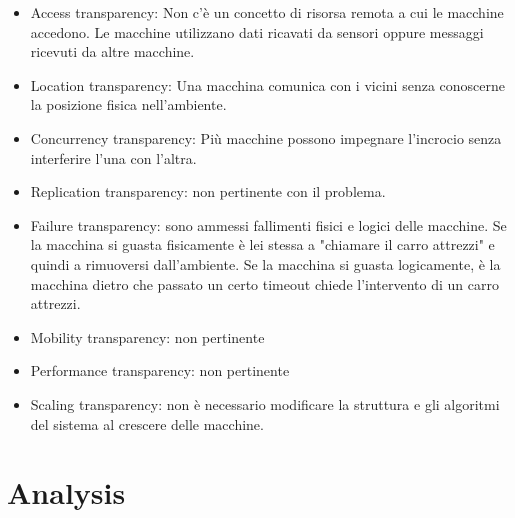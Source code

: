 \documentclass{memoir}
\begin{document}
\begin{itemize}
\item Access transparency: Non c'è un concetto di risorsa remota a cui le
  macchine accedono. Le macchine utilizzano dati ricavati da sensori oppure
  messaggi ricevuti da altre macchine.
\item Location transparency: Una macchina comunica con i vicini senza conoscerne
  la posizione fisica nell'ambiente.
\item Concurrency transparency: Più macchine possono impegnare l'incrocio senza
  interferire l'una con l'altra.
\item Replication transparency: non pertinente con il problema.
\item Failure transparency: sono ammessi fallimenti fisici e logici delle
  macchine. Se la macchina si guasta fisicamente è lei stessa a "chiamare il
  carro attrezzi" e quindi a rimuoversi dall'ambiente. Se la macchina si guasta
  logicamente, è la macchina dietro che passato un certo timeout chiede
  l'intervento di un carro attrezzi.
\item Mobility transparency: non pertinente
\item Performance transparency: non pertinente
\item Scaling transparency: non è necessario modificare la struttura e gli
  algoritmi del sistema al crescere delle macchine.
\end{itemize}


\chapter{Analysis}\label{ch:analysis}
\end{document}
